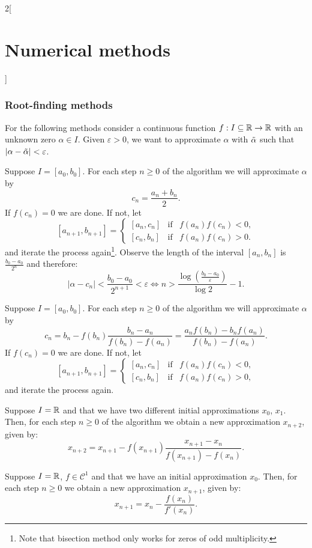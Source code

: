 \documentclass[../../../main.tex]{subfiles}
\begin{document}
\begin{multicols}{2}[\section{Numerical methods}]
\subsubsection*{Root-finding methods}
    For the following methods consider a continuous function $f:I\subseteq\mathbb{R}\rightarrow\mathbb{R}$ with an unknown zero $\alpha\in I$. Given $\varepsilon>0$, we want to approximate $\alpha$ with $\Tilde{\alpha}$ such that $|\alpha-\Tilde{\alpha}|<\varepsilon$.
\begin{theorem}
    Suppose $I=[a_0,b_0]$. For each step $n\geq 0$ of the algorithm we will approximate $\alpha$ by $$c_n=\frac{a_n+b_n}{2}.$$ If $f(c_n)=0$ we are done. If not, let 
    $$[a_{n+1},b_{n+1}]=\left\{
    \begin{array}{ccc}
        [a_n,c_n] & \text{if} & f(a_n)f(c_n)<0, \\
        \left[c_n,b_n\right] & \text{if} & f(a_n)f(c_n)>0.
    \end{array}\right.$$ 
    and iterate the process again\footnote{Note that bisection method only works for zeros of odd multiplicity.}. Observe the length of the interval $[a_n,b_n]$ is $\frac{b_0-a_0}{2^n}$ and therefore: $$|\alpha-c_n|<\frac{b_0-a_0}{2^{n+1}}<\varepsilon\iff n>\frac{\log\left(\frac{b_0-a_0}{\varepsilon}\right)}{\log 2}-1.$$
\end{theorem}
\begin{theorem}
    Suppose $I=[a_0,b_0]$. For each step $n\geq 0$ of the algorithm we will approximate $\alpha$ by $$c_n=b_n-f(b_n)\frac{b_n-a_n}{f(b_n)-f(a_n)}=\frac{a_nf(b_n)-b_nf(a_n)}{f(b_n)-f(a_n)}.$$ If $f(c_n)=0$ we are done. If not, let
    $$[a_{n+1},b_{n+1}]=\left\{
    \begin{array}{ccc}
        [a_n,c_n] & \text{if} & f(a_n)f(c_n)<0, \\
        \left[c_n,b_n\right] & \text{if} & f(a_n)f(c_n)>0,
    \end{array}\right.$$ 
    and iterate the process again.
\end{theorem}
\begin{theorem}
    Suppose $I=\mathbb{R}$ and that we have two different initial approximations $x_0$, $x_1$. Then, for each step $n\geq 0$ of the algorithm we obtain a new approximation $x_{n+2}$, given by: $$x_{n+2}=x_{n+1}-f(x_{n+1})\frac{x_{n+1}-x_n}{f(x_{n+1})-f(x_n)}.$$
\end{theorem}
\begin{theorem}
    Suppose $I=\mathbb{R}$, $f\in\mathcal{C}^1$ and that we have an initial approximation $x_0$. Then, for each step $n\geq 0$ we obtain a new approximation $x_{n+1}$, given by: $$x_{n+1}=x_n-\frac{f(x_n)}{f'(x_n)}.$$

\end{theorem}
\end{multicols}
\end{document}
